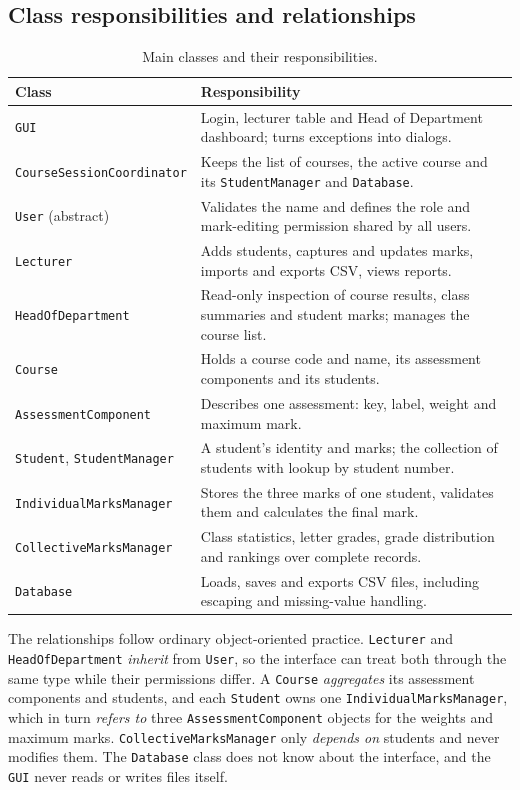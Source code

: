 \subsection{Class responsibilities and relationships}
\begin{table}[htbp]
\centering
\footnotesize
\renewcommand{\arraystretch}{1.05}
\caption{Main classes and their responsibilities.}
\label{tab:classes}
\begin{tabularx}{\textwidth}{@{}l X@{}}
\toprule
\textbf{Class} & \textbf{Responsibility}\\
\midrule
\texttt{GUI} & Login, lecturer table and Head of Department dashboard; turns exceptions into dialogs.\\
\texttt{CourseSessionCoordinator} & Keeps the list of courses, the active course and its \texttt{StudentManager} and \texttt{Database}.\\
\texttt{User} (abstract) & Validates the name and defines the role and mark-editing permission shared by all users.\\
\texttt{Lecturer} & Adds students, captures and updates marks, imports and exports CSV, views reports.\\
\texttt{HeadOfDepartment} & Read-only inspection of course results, class summaries and student marks; manages the course list.\\
\texttt{Course} & Holds a course code and name, its assessment components and its students.\\
\texttt{AssessmentComponent} & Describes one assessment: key, label, weight and maximum mark.\\
\texttt{Student}, \texttt{StudentManager} & A student's identity and marks; the collection of students with lookup by student number.\\
\texttt{IndividualMarksManager} & Stores the three marks of one student, validates them and calculates the final mark.\\
\texttt{CollectiveMarksManager} & Class statistics, letter grades, grade distribution and rankings over complete records.\\
\texttt{Database} & Loads, saves and exports CSV files, including escaping and missing-value handling.\\
\bottomrule
\end{tabularx}
\end{table}

The relationships follow ordinary object-oriented practice. \texttt{Lecturer} and \texttt{HeadOfDepartment} \emph{inherit} from \texttt{User}, so the interface can treat both through the same type while their permissions differ. A \texttt{Course} \emph{aggregates} its assessment components and students, and each \texttt{Student} owns one \texttt{IndividualMarksManager}, which in turn \emph{refers to} three \texttt{AssessmentComponent} objects for the weights and maximum marks. \texttt{CollectiveMarksManager} only \emph{depends on} students and never modifies them. The \texttt{Database} class does not know about the interface, and the \texttt{GUI} never reads or writes files itself.
